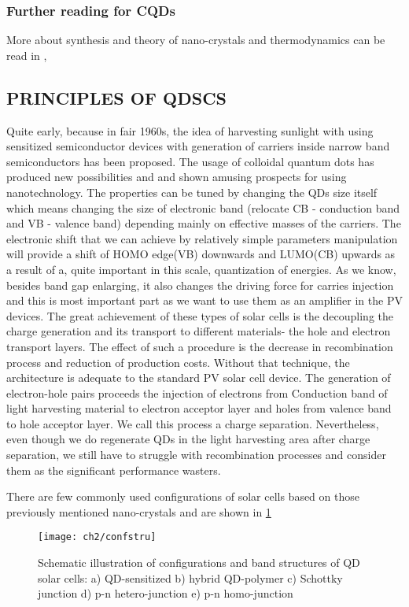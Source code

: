 \subsubsection{Further reading for CQDs}
More about synthesis and theory of nano-crystals and thermodynamics can be read in \cite{Klimov}, \cite{crystal}

\subsection{PRINCIPLES OF QDSCS}
Quite early, because in fair 1960s, the idea of harvesting sunlight with using sensitized semiconductor devices with generation of carriers inside narrow band semiconductors has been proposed. The usage of colloidal quantum dots has produced new possibilities and and shown amusing prospects for using nanotechnology. The properties can be tuned by changing the QDs size itself which means changing the size of electronic band (relocate CB - conduction band and VB - valence band) depending mainly on effective masses of the carriers. The electronic shift that we can achieve by relatively simple parameters manipulation will provide a shift of HOMO edge(VB) downwards and LUMO(CB) upwards as a result of a, quite important in this scale, quantization of energies. As we know, besides band gap enlarging, it also changes the driving force for carries injection and this is most important part as we want to use them as an amplifier in the PV devices. The great achievement of these types of solar cells is the decoupling the charge generation and its transport to different materials- the hole and electron transport layers. The effect of such a procedure is the decrease in recombination process and reduction of production costs.  Without that technique, the architecture is adequate to the standard PV solar cell device. The generation of electron-hole pairs proceeds the injection of electrons from Conduction band of light harvesting material to electron acceptor layer and holes from valence band to hole acceptor layer. We call this process a charge separation. Nevertheless, even though we do regenerate QDs in the light harvesting area after charge separation, we still have to struggle with recombination processes and consider them as the significant performance wasters. \cite{S.Gimenez2009}


There are few commonly used configurations of solar cells based on those previously mentioned nano-crystals and are shown in \ref{fig:confstru}

\begin{figure}[h]
\centering
\texttt{[image: ch2/confstru]}
\caption{Schematic illustration of configurations and band structures of QD solar cells: a) QD-sensitized b) hybrid QD-polymer c) Schottky junction d) p-n hetero-junction e) p-n homo-junction \cite{HuashangRao2018}}
\label{fig:confstru}
\end{figure}

